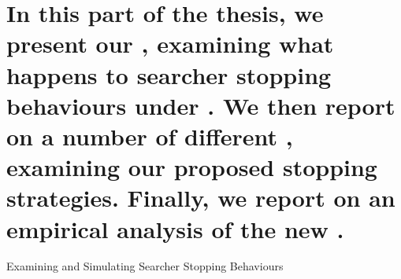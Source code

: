 
\newcommand{\partheaderimage}{figures/p3-header}
\part[Examining Searcher Stopping Behaviours]{In this part of the thesis, we present our , examining what happens to searcher stopping behaviours under . We then report on a number of different , examining our proposed stopping strategies. Finally, we report on an empirical analysis of the new .}{Examining and Simulating Searcher Stopping Behaviours}\label{part:context}